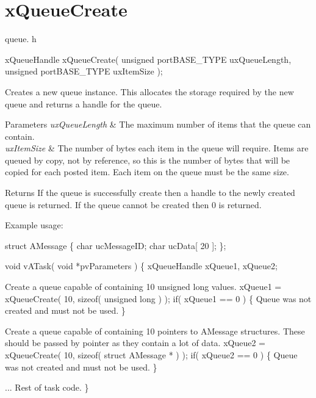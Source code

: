 \hypertarget{group__x_queue_create}{\section{x\-Queue\-Create}
\label{group__x_queue_create}
}
queue. h 
\begin{DoxyPre}
 xQueueHandle xQueueCreate(
                              unsigned portBASE\_TYPE uxQueueLength,
                              unsigned portBASE\_TYPE uxItemSize
                          );
   \end{DoxyPre}


Creates a new queue instance. This allocates the storage required by the new queue and returns a handle for the queue.


\begin{DoxyParams}{Parameters}
{\em ux\-Queue\-Length} & The maximum number of items that the queue can contain.\\
\hline
{\em ux\-Item\-Size} & The number of bytes each item in the queue will require. Items are queued by copy, not by reference, so this is the number of bytes that will be copied for each posted item. Each item on the queue must be the same size.\\
\hline
\end{DoxyParams}
\begin{DoxyReturn}{Returns}
If the queue is successfully create then a handle to the newly created queue is returned. If the queue cannot be created then 0 is returned.
\end{DoxyReturn}
Example usage\-: 
\begin{DoxyPre}
 struct AMessage
 \{
    char ucMessageID;
    char ucData[ 20 ];
 \};\end{DoxyPre}



\begin{DoxyPre} void vATask( void *pvParameters )
 \{
 xQueueHandle xQueue1, xQueue2;\end{DoxyPre}



\begin{DoxyPre}Create a queue capable of containing 10 unsigned long values.
    xQueue1 = xQueueCreate( 10, sizeof( unsigned long ) );
    if( xQueue1 == 0 )
    \{
Queue was not created and must not be used.
    \}\end{DoxyPre}



\begin{DoxyPre}Create a queue capable of containing 10 pointers to AMessage structures.
These should be passed by pointer as they contain a lot of data.
    xQueue2 = xQueueCreate( 10, sizeof( struct AMessage * ) );
    if( xQueue2 == 0 )
    \{
Queue was not created and must not be used.
    \}\end{DoxyPre}



\begin{DoxyPre}... Rest of task code.
 \}
 \end{DoxyPre}
 